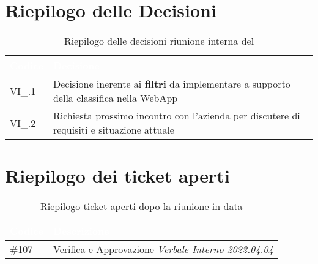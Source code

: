 \section{Riepilogo delle Decisioni}


\begin{table}[!htbp]
    \renewcommand{\arraystretch}{1.5}
    \begin{tabular}{m{}<{\centering}  m{}<{\centering}}
        \rowcolor{darkblue} \textcolor{white}{\textbf{Codice}} & \textcolor{white}{\textbf{Decisione}}                        \\
        \hline
        VI\_{}\D{}.1                                           & Decisione inerente ai \textbf{filtri} da implementare a supporto della classifica nella WebApp \\
        VI\_{}\D{}.2                                           & Richiesta prossimo incontro con l'azienda per discutere di requisiti e situazione attuale \\
    \end{tabular}
    \caption{Riepilogo delle decisioni riunione interna del \D}
\end{table}

\section{Riepilogo dei ticket aperti}

\begin{table}[!htbp]
    \renewcommand{\arraystretch}{1.5}
    \begin{tabular}{m{}<{\centering}  m{}<{\centering}}
        \rowcolor{darkblue} \textcolor{white}{\textbf{Codice}} & \textcolor{white}{\textbf{Descrizione}}                        \\
        \hline
        \#{107}										  & Verifica e Approvazione \textit{Verbale Interno 2022.04.04} \\
    \end{tabular}
    \caption{Riepilogo ticket aperti dopo la riunione in data \D}
\end{table}